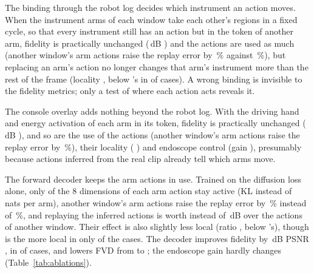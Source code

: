 The binding through the robot log decides which instrument an action moves. When the instrument arms of each window take each other's regions in a fixed cycle, so that every instrument still has an action but in the token of another arm, fidelity is practically unchanged (\,dB ) and the actions are used as much (another window's arm actions raise the replay error by \,\% against \,\%), but replacing an arm's action no longer changes that arm's instrument more than the rest of the frame (locality  , below \method{}'s in  of  cases). A wrong binding is invisible to the fidelity metrics; only a test of where each action acts reveals it.

The console overlay adds nothing beyond the robot log. With the driving hand and energy activation of each arm in its token, fidelity is practically unchanged (\,dB ), and so are the use of the actions (another window's arm actions raise the replay error by \,\%), their locality ( ) and endoscope control (gain ), presumably because actions inferred from the real clip already tell which arms move.

The forward decoder keeps the arm actions in use. Trained on the diffusion loss alone, only  of the 8 dimensions of each arm action stay active (KL  instead of \,nats per arm), another window's arm actions raise the replay error by \,\% instead of \,\%, and replaying the inferred actions is worth  instead of \,dB over the actions of another window. Their effect is also slightly less local (ratio ,   below \method{}'s), though \method{} is the more local in only  of the  cases. The decoder improves fidelity by \,dB PSNR , in  of  cases, and lowers FVD from  to ; the endoscope gain hardly changes (Table~\ref{tab:ablations}).

